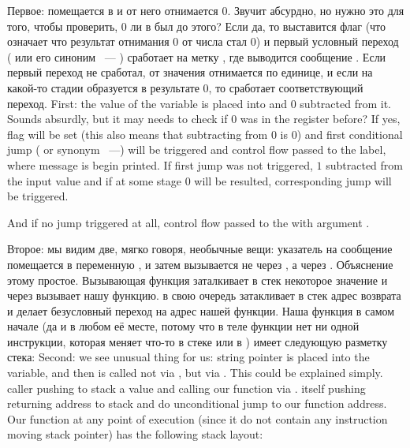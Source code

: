 \IFRU
{Первое:  помещается в \EAX и от него отнимается 0. Звучит абсурдно, но нужно это для того, чтобы проверить, 
0 ли в \EAX был до этого? Если да, то выставится флаг \ZF (что означает что результат отнимания $0$ от числа 
стал $0$) и первый условный переход \JE ( или его синоним \JZ ~--- ) 
сработает на метку , где выводится сообщение .
Если первый переход не сработал, от значения отнимается по единице, 
и если на какой-то стадии образуется в результате $0$, то сработает соответствующий переход.}
{First: the value of the  variable is placed into \EAX and $0$ subtracted from it. Sounds absurdly, but it may needs to check if 
$0$ was in the \EAX register before? If yes, flag \ZF will be set (this also means that subtracting from $0$ is $0$) 
and first conditional jump \JE ( or synonym \JZ~---) will be triggered 
and control flow passed to the  label, where  message is begin printed. 
If first jump was not triggered, $1$ subtracted from the input value and if at some stage $0$ will be resulted, 
corresponding jump will be triggered.}

{And if no jump triggered at all, control flow passed to the \printf with argument .}

\label{jump_to_last_printf}
\index{\Stack}
\IFRU
{Второе: мы видим две, мягко говоря, необычные вещи: указатель на сообщение помещается в переменную , 
и затем \printf вызывается не через \CALL, а через \JMP. Объяснение этому простое. 
Вызывающая функция заталкивает в стек некоторое значение и через \CALL вызывает нашу функцию. 
\CALL в свою очередь затакливает в стек адрес возврата и делает безусловный переход на адрес нашей функции. 
Наша функция в самом начале (да и в любом её месте, потому что в теле функции нет ни одной инструкции, 
которая меняет что-то в стеке или в \ESP) имеет следующую разметку стека:}
{Second: we see unusual thing for us: string pointer is placed into the  variable, and 
then \printf is called not via \CALL, but via \JMP. This could be explained simply. 
\Gls{caller} pushing to stack a value and calling our function via \CALL. 
\CALL itself pushing returning address to stack and do unconditional jump to our function address. 
Our function at any point of execution (since it do not contain any instruction moving stack 
pointer) has the following stack layout:}

